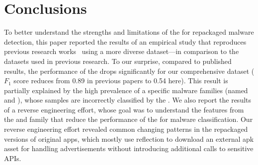 \section{Conclusions}\label{sec:conclusions}


To better understand the strengths and limitations of the \mas for repackaged malware detection, this paper reported the results of an empirical study that reproduces previous research works~\cite{DBLP:conf/wcre/BaoLL18,DBLP:journals/jss/CostaMMSSBNR22} using a more diverse dataset---in comparison to the datasets used in previous research. To our surprise, compared to published results, the performance of the \mas drops significantly for our comprehensive dataset ($F_1$ score reduces from 0.89 in previous papers to 0.54 here). This result is partially explained by the high prevalence of a specific malware families (named \gps and \rmb), whose samples are incorrectly classified by the \mas. We also report the results of a reverse engineering effort, whose goal was to understand the features from the \gps and \rmb family that reduce the performance of the \mas for malware classification. Our reverse engineering effort revealed common changing patterns in the \gps repackaged versions of original apps, which mostly use reflection to download an external apk asset for handling advertisements without introducing additional calls to sensitive APIs. 







